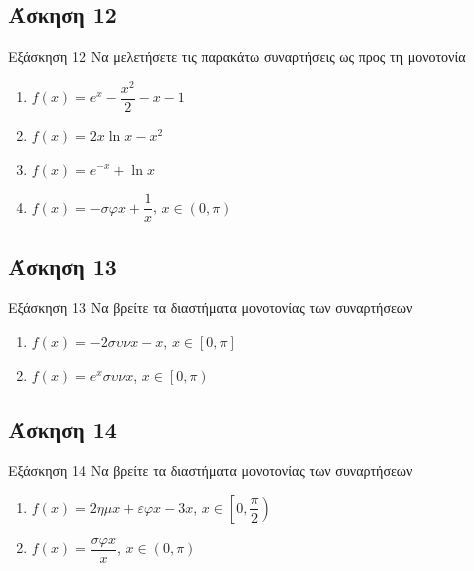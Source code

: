 \documentclass[greek]{beamer}
\begin{document}
\subsection{Άσκηση 12}
\begin{frame}[label=Άσκηση12]{Εξάσκηση 12}
  Να μελετήσετε τις παρακάτω συναρτήσεις ως προς τη μονοτονία
  \begin{enumerate}
    \item<1-> $f(x)=e^x-\dfrac{x^2}{2}-x-1$
    \item<2-> $f(x)=2x\ln x-x^2$
    \item<3-> $f(x)=e^{-x}+\ln x$
    \item<4-> $f(x)=-σφx+\dfrac{1}{x}$, $x\in (0,\pi)$
  \end{enumerate}

\end{frame}

\subsection{Άσκηση 13}
\begin{frame}[label=Άσκηση13]{Εξάσκηση 13}
  Να βρείτε τα διαστήματα μονοτονίας των συναρτήσεων
  \begin{enumerate}
    \item<1-> $f(x)=-2συνx-x$, $x\in [0,\pi]$
    \item<2-> $f(x)=e^xσυνx$, $x\in \left[ 0,\pi \right) $
  \end{enumerate}

\end{frame}

\subsection{Άσκηση 14}
\begin{frame}[label=Άσκηση14]{Εξάσκηση 14}
  Να βρείτε τα διαστήματα μονοτονίας των συναρτήσεων
  \begin{enumerate}
    \item<1-> $f(x)=2ημx+εφx-3x$, $x\in \left[ 0,\dfrac{\pi}{2} \right) $
    \item<2-> $f(x)=\dfrac{σφx}{x}$, $x\in (0,\pi) $
  \end{enumerate}

\end{frame}
\end{document}
